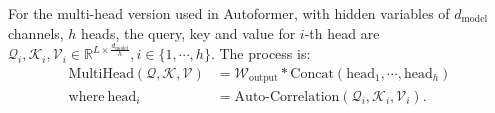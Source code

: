 For the multi-head version used in Autoformer, with hidden variables of $d_{\mathrm{model}}$ channels, $h$ heads, the query, key and value for $i$-th head are $\mathcal{Q}_{i},\mathcal{K}_{i},\mathcal{V}_{i}\in\mathbb{R}^{L\times \frac{d_{\mathrm{model}}}{h}}, i\in\{1,\cdots,h\}$. The process is:
\begin{equation}\label{equ:autocorrelation_multihead}
  \begin{split}
  \mathrm{MultiHead}(\mathcal{Q},\mathcal{K},\mathcal{V}) &= \mathcal{W_\mathrm{output}}\ast\mathrm{Concat}(\mathrm{head}_{1},\cdots,\mathrm{head}_{h}) \\
  \mathrm{where}\ \mathrm{head}_{i} &= \mathrm{Auto\text{-}Correlation}(\mathcal{Q}_{i},\mathcal{K}_{i},\mathcal{V}_{i}).
  \end{split}
\end{equation}

